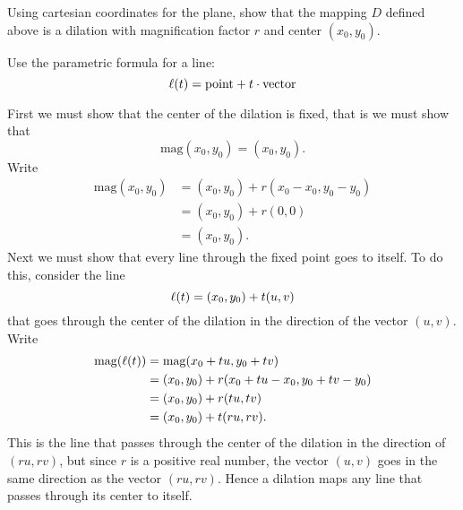\documentclass[newpage,hints,handout,12pt,noauthor,nooutcomes]{ximera}
\begin{document}
\begin{problem}
Using cartesian coordinates for the plane, show that the mapping $D$
defined above is a dilation with magnification factor $r$ and center
$\left( x_{0},y_{0}\right) $.
\begin{hint}
  Use the parametric formula for a line:
  \[
  \ell(t) = \text{point} + t \cdot \text{vector}
  \]
\end{hint}
\begin{freeResponse}
First we must show that the center of the dilation is fixed, that is we must show that 
\[
\mathrm{mag}(x_0,y_0) = (x_0,y_0).
\]
Write
\begin{align*}
\mathrm{mag}(x_0,y_0) &= (x_0,y_0) + r(x_0-x_0,y_0-y_0)\\
&= (x_0,y_0) + r(0,0)\\
&=(x_0,y_0).
\end{align*}
Next we must show that every line through the fixed point goes to
itself. To do this, consider the line
\[
\ell(t) = (x_0,y_0) + t(u,v)
\]
that goes through the center of the dilation in the direction of the
vector $(u,v)$. Write
\begin{align*}
\mathrm{mag}(\ell(t)) &= \mathrm{mag}(x_0+tu,y_0+tv)\\
&= (x_0,y_0) + r(x_0+tu-x_0,y_0+tv-y_0)\\
&= (x_0,y_0) + r(tu,tv)\\
&= (x_0,y_0) + t(ru,rv). 
\end{align*}
This is the line that passes through the center of the dilation in the
direction of $(ru,rv)$, but since $r$ is a positive real number, the
vector $(u,v)$ goes in the same direction as the vector
$(ru,rv)$. Hence a dilation maps any line that passes through its
center to itself.


\end{freeResponse}
\end{problem}
\end{document}
